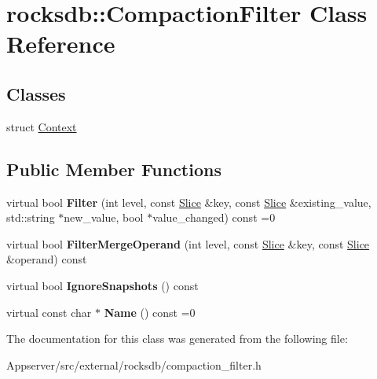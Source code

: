 \hypertarget{classrocksdb_1_1CompactionFilter}{}\section{rocksdb\+:\+:Compaction\+Filter Class Reference}
\label{classrocksdb_1_1CompactionFilter}
\subsection*{Classes}
\begin{DoxyCompactItemize}
\item 
struct \hyperlink{structrocksdb_1_1CompactionFilter_1_1Context}{Context}
\end{DoxyCompactItemize}
\subsection*{Public Member Functions}
\begin{DoxyCompactItemize}
\item 
virtual bool {\bfseries Filter} (int level, const \hyperlink{classrocksdb_1_1Slice}{Slice} \&key, const \hyperlink{classrocksdb_1_1Slice}{Slice} \&existing\+\_\+value, std\+::string $\ast$new\+\_\+value, bool $\ast$value\+\_\+changed) const =0\hypertarget{classrocksdb_1_1CompactionFilter_a7895ef194328ca68419f4559f8ef3f3e}{}\label{classrocksdb_1_1CompactionFilter_a7895ef194328ca68419f4559f8ef3f3e}

\item 
virtual bool {\bfseries Filter\+Merge\+Operand} (int level, const \hyperlink{classrocksdb_1_1Slice}{Slice} \&key, const \hyperlink{classrocksdb_1_1Slice}{Slice} \&operand) const\hypertarget{classrocksdb_1_1CompactionFilter_abbb7b97125949575155147d0ed3c0349}{}\label{classrocksdb_1_1CompactionFilter_abbb7b97125949575155147d0ed3c0349}

\item 
virtual bool {\bfseries Ignore\+Snapshots} () const\hypertarget{classrocksdb_1_1CompactionFilter_ac441dd2c4d04235b47b2367c821cb36c}{}\label{classrocksdb_1_1CompactionFilter_ac441dd2c4d04235b47b2367c821cb36c}

\item 
virtual const char $\ast$ {\bfseries Name} () const =0\hypertarget{classrocksdb_1_1CompactionFilter_ad1494025487cde909a53510b94456d56}{}\label{classrocksdb_1_1CompactionFilter_ad1494025487cde909a53510b94456d56}

\end{DoxyCompactItemize}


The documentation for this class was generated from the following file\+:\begin{DoxyCompactItemize}
\item 
Appserver/src/external/rocksdb/compaction\+\_\+filter.\+h\end{DoxyCompactItemize}
